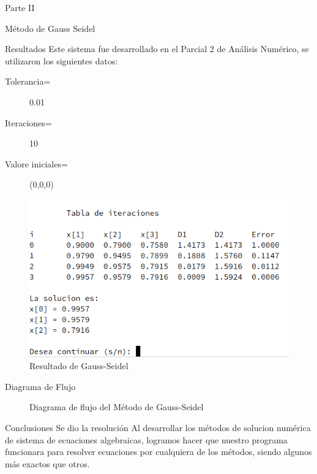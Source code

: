 \documentclass[legalpaper, 12pt]{article}
\begin{document}
\begin{section}{Parte II}
\begin{subsection}{Método de Gauss Seidel}
\begin{subsubsection}{Resultados}
        Este sistema fue desarrollado en el Parcial 2 de Análisis Numérico,
        se utilizaron los siguientes datos:
        \begin{description}
          \item[Tolerancia=]0.01
          \item[Iteraciones=]10
          \item[Valore iniciales=](0,0,0)
        \end{description}
        \begin{figure}[h]
          \centering
          \includegraphics[scale=0.9]{seidel.png}
          \caption{Resultado de Gauss-Seidel}
        \end{figure}
      \end{subsubsection}
      \newpage
      \begin{subsubsection}{Diagrama de Flujo}
        \begin{figure}[h]
          \centering
          
          \caption{Diagrama de flujo del Método de Gauss-Seidel}
        \end{figure}
      \end{subsubsection}
      \break
    \end{subsection}
    \begin{subsection}{Conclusiones}
      Se dio la resolución
      Al desarrollar los métodos de solucion numérica de sistema de
      ecuaciones algebraicas, logramos hacer que nuestro programa
      funcionara para resolver ecuaciones por cualquiera de los métodos,
      siendo algunos más exactos que otros.


\end{subsection}
\end{section}
\end{document}
